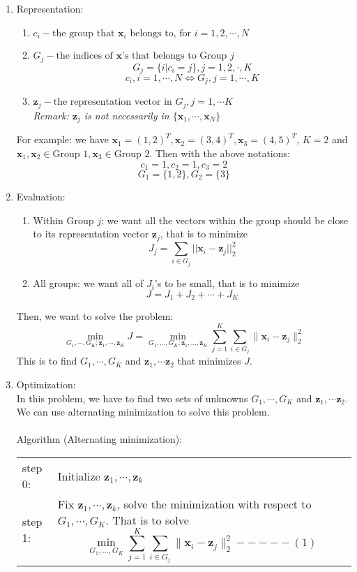 \documentclass[11pt]{article}
\newcommand{\vx}{\mathbf{x}}
\newcommand{\vz}{\mathbf{z}}
\begin{document}
\begin{enumerate}
\item Representation:
\begin{enumerate}
\item $c_{i} - \text{the group that }\vx_i \text{ belongs to, for }i = 1, 2, \cdots, N$
\item $G_j  - \text{the indices of $\vx$'s that belongs to Group $j$}$ $$G_j = \{i | c_i = j \}, j = 1,2,\cdot, K$$
$$c_i, i = 1, \cdots, N \iff G_j, j=1, \cdots, K$$
\item $\vz_j - \text{the representation vector in }G_j , j = 1, \cdots K$\\
\textit{Remark: $\vz_j$ is not necessarily in $\{\vx_1, \cdots, \vx_N\}$}
\end{enumerate}
For example: we have $\vx_1 = (1,2)^T, \vx_2 = (3,4)^T, \vx_3 = (4,5)^T$, $K=2$ and $\vx_1, \vx_2 \in \text{Group 1}, \vx_3 \in \text{Group 2}$. Then with the above notations: $$c_1 = 1, c_2 =1, c_3 =2$$ $$G_1 = \{1,2\}, G_2 = \{3\}$$
\item Evaluation:
\begin{enumerate}
\item Within Group $j$: we want all the vectors within the group should be close to its representation vector $\vz_j$, that is to minimize $$J_j = \sum_{i \in G_j} ||\vx_i - \vz_j||_2 ^2$$
\item All groups: we want all of $J_i$'s to be small, that is to minimize $$J = J_1 + J_2 + \cdots + J_K$$
\end{enumerate}
Then, we want to solve the problem: $$\min_{G_1, \cdots, G_K; \vz_1, \cdots, \vz_K} J = \min_{G_1, \ldots, G_K; \vz_1, \ldots, \vz_K} \sum_{j=1}^{K} \sum_{i \in G_j} \|\vx_i - \vz_j\|_2^2$$
This is to find $G_1, \cdots, G_K$ and $\vz_1, \cdots \vz_2$ that minimizes $J$.
\item Optimization:\\
In this problem, we have to find two sets of unknowns $G_1, \cdots, G_K$ and $\vz_1, \cdots \vz_2$. We can use alternating minimization  to solve this problem.\\\\
Algorithm (Alternating minimization):\\
\begin{tabular}{lp{15cm}}
step 0:& Initialize $\vz_1, \cdots, \vz_k$\\
step 1:& Fix $\vz_1, \cdots, \vz_k$, solve the minimization with respect to $G_1, \cdots, G_K$. That is to solve $$\min_{G_1, \ldots, G_K} \sum_{j=1}^{K} \sum_{i \in G_j} \|\vx_i - \vz_j\|_2^2 -----(1)$$\\

\end{tabular}
\end{enumerate}
\end{document}
